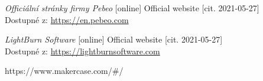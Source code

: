 \begin{thebibliography}{99}
\textit{Officiální stránky firmy Pebeo} [online] Official website [cit. 2021-05-27] \\
Dostupné z: \url{https://en.pebeo.com} 

\textit{LightBurn Software} [online] Official website [cit. 2021-05-27] \\
Dostupné z: \url{https://lightburnsoftware.com} 



https://www.makercase.com/#/

\end{thebibliography}
